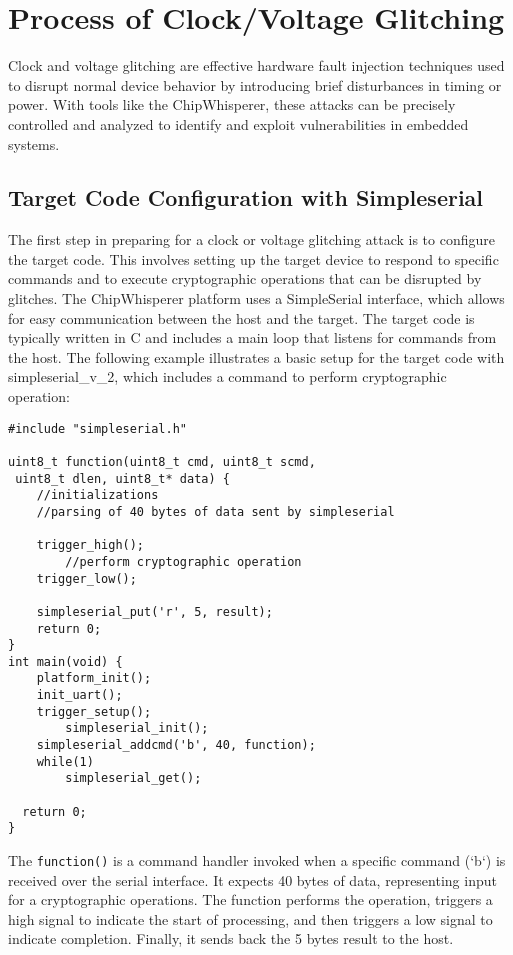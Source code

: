 \section{Process of Clock/Voltage Glitching}

Clock and voltage glitching are effective hardware fault injection techniques used to disrupt normal device behavior by introducing brief disturbances in timing or power. With tools like the ChipWhisperer, these attacks can be precisely controlled and analyzed to identify and exploit vulnerabilities in embedded systems.

\subsection{Target Code Configuration with Simpleserial}
The first step in preparing for a clock or voltage glitching attack is to configure the target code. This involves setting up the target device to respond to specific commands and to execute cryptographic operations that can be disrupted by glitches. The ChipWhisperer platform uses a SimpleSerial interface, which allows for easy communication between the host and the target.
The target code is typically written in C and includes a main loop that listens for commands from the host. The following example illustrates a basic setup for the target code with simpleserial\_v\_{2}, which includes a command to perform cryptographic operation:
\begin{verbatim}
#include "simpleserial.h"

uint8_t function(uint8_t cmd, uint8_t scmd,
 uint8_t dlen, uint8_t* data) {
    //initializations
    //parsing of 40 bytes of data sent by simpleserial

    trigger_high();
        //perform cryptographic operation
    trigger_low();
    
    simpleserial_put('r', 5, result);
    return 0;
}
int main(void) {
    platform_init();
    init_uart();
    trigger_setup();
	    simpleserial_init();
    simpleserial_addcmd('b', 40, function);
    while(1)
        simpleserial_get();
    
  return 0;
}
\end{verbatim}
The \texttt{function()} is a command handler invoked when a specific command (`b`) is received over the serial interface. It expects 40 bytes of data, representing input for a cryptographic operations. The function performs the operation, triggers a high signal to indicate the start of processing, and then triggers a low signal to indicate completion. Finally, it sends back the 5 bytes result to the host.

